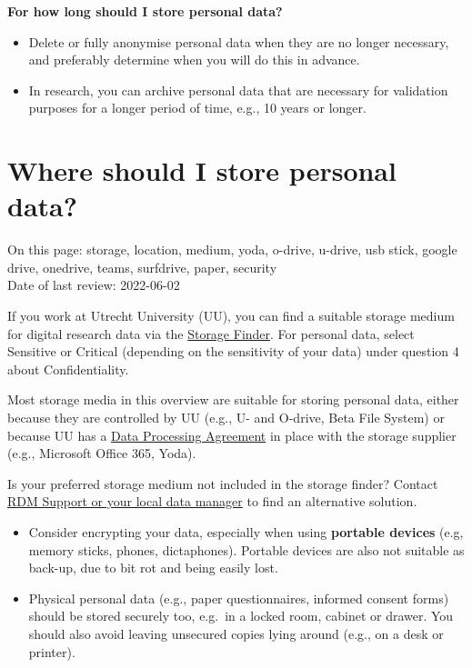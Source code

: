 \documentclass[
]{book}
\providecommand{\tightlist}{%
  \setlength{\itemsep}{0pt}\setlength{\parskip}{0pt}}
\begin{document}
\textbf{For how long should I store personal data?}

\begin{itemize}
\tightlist
\item
  Delete or fully anonymise personal data when they are no longer necessary,
  and preferably determine when you will do this in advance.
\item
  In research, you can archive personal data that are necessary for validation
  purposes for a longer period of time, e.g., 10 years or longer.
\end{itemize}

\hypertarget{data-storage-where}{%
\section{Where should I store personal data?}\label{data-storage-where}}

On this page: storage, location, medium, yoda, o-drive, u-drive, usb stick,
google drive, onedrive, teams, surfdrive, paper, security\\
Date of last review: 2022-06-02

If you work at Utrecht University (UU), you can find a suitable storage medium for
digital research data via the
\href{https://tools.uu.nl/storagefinder/}{Storage Finder}. For
personal data, select Sensitive or Critical (depending on the sensitivity of
your data) under question 4 about Confidentiality.

Most storage media in this overview are suitable for storing personal data, either
because they are controlled by UU (e.g., U- and O-drive, Beta File System) or
because UU has a \protect\hyperlink{data-processing-agreement}{Data Processing Agreement} in
place with the storage supplier (e.g., Microsoft Office 365, Yoda).

Is your preferred storage medium not included in the storage finder? Contact
\protect\hyperlink{support}{RDM Support or your local data manager} to find an alternative solution.

\begin{itemize}
\tightlist
\item
  Consider encrypting your data, especially when using \textbf{portable devices}
  (e.g, memory sticks, phones, dictaphones). Portable devices are also not suitable as back-up,
  due to bit rot and being easily lost.
\item
  Physical personal data (e.g., paper questionnaires, informed consent forms)
  should be stored securely too, e.g.~in a locked room, cabinet or drawer. You
  should also avoid leaving unsecured copies lying around (e.g., on a desk or printer).
\end{itemize}
\end{document}
